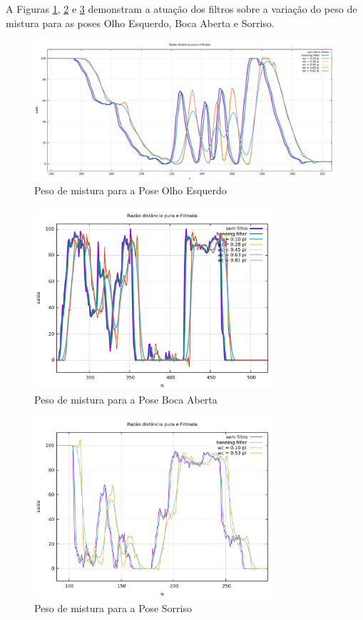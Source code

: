 A Figuras \ref{fig:filter-left-eye}, \ref{fig:filter-open-mouth} e \ref{fig:filter-smile} demonstram a atuação dos filtros sobre a variação do peso de mistura para as poses Olho Esquerdo, Boca Aberta e Sorriso.

\begin{figure}[!htb]
\centering
\includegraphics[width=1.0\textwidth]{figs/filter-result-open-mouth.pdf} 
\caption{Peso de mistura para a Pose Olho Esquerdo}
\label{fig:filter-left-eye}
\end{figure}

\begin{figure}[!htb]
\centering
\includegraphics[width=0.8\textwidth]{figs/filter-result-left-eye.pdf} 
\caption{Peso de mistura para a Pose Boca Aberta}
\label{fig:filter-open-mouth}
\end{figure}

\begin{figure}[!htb]
\centering
\includegraphics[width=0.8\textwidth]{figs/filter-result-smile-2.pdf} 
\caption{Peso de mistura para a Pose Sorriso}
\label{fig:filter-smile}
\end{figure}

